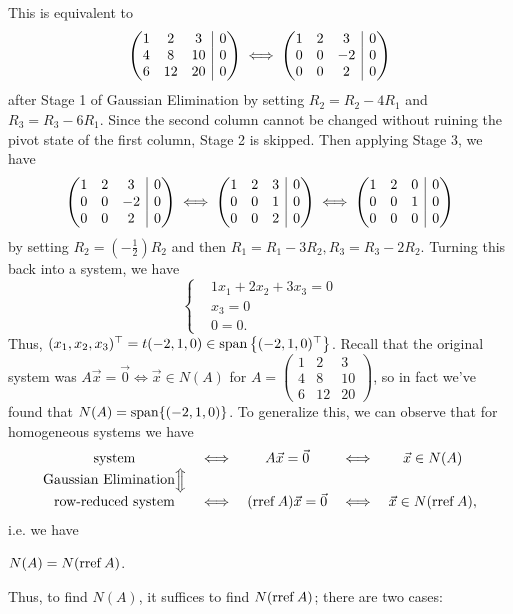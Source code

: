 \documentclass[main.tex]{subfiles}
\begin{document}
This is equivalent to
\[\left(\begin{array}{@{}c c c | c@{}}
    1 & 2 & 3 & 0 \\
    4 & 8 & 10 & 0 \\
    6 & 12 & 20 & 0
\end{array}\right) \iff \left(\begin{array}{@{}c c c | c@{}}
    1 & 2 & 3 & 0 \\
    0 & 0 & -2 & 0 \\
    0 & 0 & 2 & 0
\end{array}\right)\]
after Stage 1 of Gaussian Elimination by setting $R_2 = R_2 - 4R_1$ and $R_3 = R_3 - 6R_1$. Since the second column cannot be changed without ruining the pivot state of the first column, Stage 2 is skipped. Then applying Stage 3, we have
\[\left(\begin{array}{@{}c c c | c@{}}
    1 & 2 & 3 & 0 \\
    0 & 0 & -2 & 0 \\
    0 & 0 & 2 & 0
\end{array}\right)\iff \left(\begin{array}{@{}c c c | c@{}}
    1 & 2 & 3 & 0 \\
    0 & 0 & 1 & 0 \\
    0 & 0 & 2 & 0
\end{array}\right)\iff \left(\begin{array}{@{}c c c | c@{}}
    1 & 2 & 0 & 0 \\
    0 & 0 & 1 & 0 \\
    0 & 0 & 0 & 0
\end{array}\right)\]
by setting $R_2 = (-\frac{1}{2})R_2$ and then $R_1 = R_1 - 3R_2, R_3 = R_3 - 2R_2$. Turning this back into a system, we have
\[\left\{\begin{aligned}
    &1x_1 + 2x_2 + 3x_3 = 0 \\
    &x_3 = 0 \\
    &0 = 0.
    \end{aligned}\right.\]
Thus, $(x_1, x_2, x_3)^\top = t(-2, 1, 0)\in \operatorname{span}\left\{(-2, 1, 0)^\top\right\}$. Recall that the original system was $A\vec{x} = \vec{0}\iff \vec{x}\in N(A)$ for $A = \begin{pmatrix}
    1 & 2 & 3 \\
    4 & 8 & 10 \\
    6 & 12 & 20
\end{pmatrix}$, so in fact we've found that $N(A) = \operatorname{span}\{(-2, 1, 0)\}$. To generalize this, we can observe that for homogeneous systems we have
\[\begin{array}{c c c c c}
    \text{system} & \iff & A\vec{x} = \vec{0} & \iff & \vec{x}\in N(A) \\
    \text{Gaussian Elimination}\Big\Updownarrow & & & & \\
    \text{row-reduced system} & \iff & (\operatorname{rref} A)\vec{x} = \vec{0} & \iff & \vec{x}\in N(\operatorname{rref} A),
\end{array}\]
i.e. we have
\begin{theorem}
$N(A) = N(\operatorname{rref} A)$.
\end{theorem}
Thus, to find $N(A)$, it suffices to find $N(\operatorname{rref} A)$; there are two cases:
\end{document}
